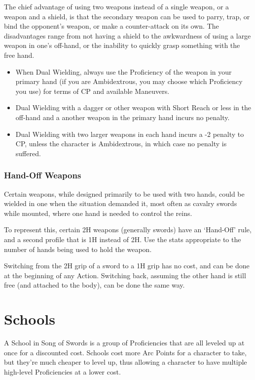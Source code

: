 \documentclass[oneside,11pt,english]{book}
\begin{document}
The chief advantage of using two weapons instead of a single weapon, or a weapon
and a shield, is that the secondary weapon can be used to parry, trap, or bind
the opponent’s weapon, or make a counter-attack on its own. The disadvantages
range from not having a shield to the awkwardness of using a large weapon in
one’s off-hand, or the inability to quickly grasp something with the free hand.
\begin{itemize}
\item When Dual Wielding, always use the Proficiency of the weapon in your
  primary hand (if you are Ambidextrous, you may choose which Proficiency you
  use) for terms of CP and available Maneuvers.
\item Dual Wielding with a dagger or other weapon with Short Reach or less in
  the off-hand and a another weapon in the primary hand incurs no penalty.
\item Dual Wielding with two larger weapons in each hand incurs a -2 penalty to
  CP, unless the character is Ambidextrous, in which case no penalty is
  suffered.
\end{itemize}

\subsubsection{Hand-Off Weapons}
Certain weapons, while designed primarily to be used with two hands, could be
wielded in one when the situation demanded it, most often as cavalry swords
while mounted, where one hand is needed to control the reins.

To represent this, certain 2H weapons (generally swords) have an ‘Hand-Off’
rule, and a second profile that is 1H instead of 2H. Use the stats appropriate
to the number of hands being used to hold the weapon.

Switching from the 2H grip of a sword to a 1H grip has no cost, and can be done
at the beginning of any Action. Switching back, assuming the other hand is still
free (and attached to the body), can be done the same way.

\section{Schools}
A School in Song of Swords is a group of Proficiencies that are all leveled up
at once for a discounted cost. Schools cost more Arc Points for a character to
take, but they’re much cheaper to level up, thus allowing a character to have
multiple high-level Proficiencies at a lower cost.
\end{document}
